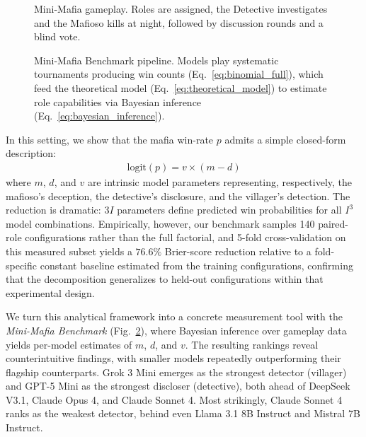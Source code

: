 \documentclass[sigconf,anonymous,balance=false]{aamas}
\begin{document}
\begin{figure}[t!]
    \centering
    \resizebox{\linewidth}{!}{%
    }
    \caption{Mini-Mafia gameplay. Roles are assigned, the Detective investigates and the Mafioso kills at night, followed by discussion rounds and a blind vote.}
    \label{fig:mini-mafia-gameplay}
\end{figure}

\begin{figure}[t!]
    \centering
    \resizebox{\linewidth}{!}{%
    }
    \caption{Mini-Mafia Benchmark pipeline. Models play systematic tournaments producing win counts (Eq.~\ref{eq:binomial_full}), which feed the theoretical model (Eq.~\ref{eq:theoretical_model}) to estimate role capabilities via Bayesian inference (Eq.~\ref{eq:bayesian_inference}).}
    \label{fig:mini-mafia-benchmark}
\end{figure}


In this setting, we show that the mafia win-rate $p$ admits a simple closed-form description:
\begin{align}
    \text{logit}(p) = v \times (m - d)
\end{align}
where $m$, $d$, and $v$ are intrinsic model parameters representing, respectively, the mafioso's deception, the detective's disclosure, and the villager's detection. The reduction is dramatic: $3I$ parameters define predicted win probabilities for all $I^3$ model combinations. Empirically, however, our benchmark samples 140 paired-role configurations rather than the full factorial, and 5-fold cross-validation on this measured subset yields a $76.6\%$ Brier-score reduction relative to a fold-specific constant baseline estimated from the training configurations, confirming that the decomposition generalizes to held-out configurations within that experimental design.

We turn this analytical framework into a concrete measurement tool with the \textit{Mini-Mafia Benchmark} (Fig.~\ref{fig:mini-mafia-benchmark}), where Bayesian inference over gameplay data yields per-model estimates of $m$, $d$, and $v$. The resulting rankings reveal counterintuitive findings, with smaller models repeatedly outperforming their flagship counterparts. Grok 3 Mini emerges as the strongest detector (villager) and GPT-5 Mini as the strongest discloser (detective), both ahead of DeepSeek V3.1, Claude Opus 4, and Claude Sonnet 4. Most strikingly, Claude Sonnet 4 ranks as the weakest detector, behind even Llama 3.1 8B Instruct and Mistral 7B Instruct.
\end{document}
